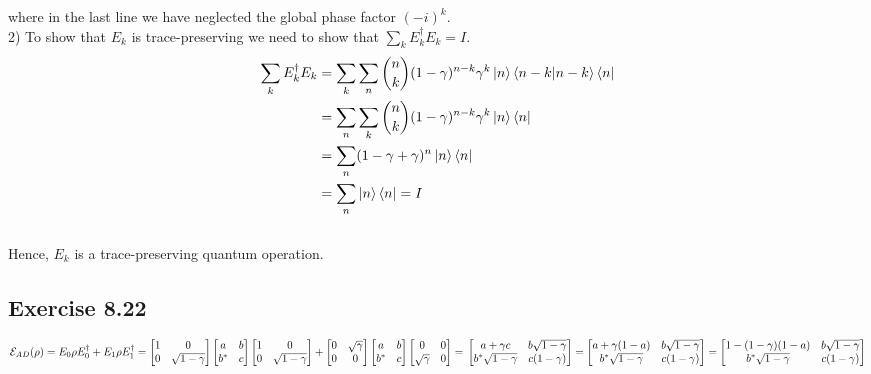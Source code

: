 \documentclass[a4paper,12pt]{article}
\begin{document}
where in the last line we have neglected the global phase factor $(-i)^k$.\\
2) To show that $E_k$ is trace-preserving we need to show that $\displaystyle \sum_k E_k^\dagger E_k=I$.
\begin{align*}
    \displaystyle \sum_k E_k^\dagger E_k&=\sum_k\sum_n{n \choose k}(1-\gamma)^{n-k}\gamma^k
    \ket{n}\braket{n-k|n-k}\bra{n}\\
    &= \sum_n\sum_k{n \choose k}(1-\gamma)^{n-k}\gamma^k
    \ket{n}\bra{n}\\
    &=\sum_n(1-\gamma+\gamma)^n\ket{n}\bra{n}\\
    &=\sum_n \ket{n}\bra{n}=I
\end{align*}\\

Hence, $E_k$ is a trace-preserving quantum operation.
\subsection*{Exercise 8.22}
$\mathcal{E}_{AD}(\rho)=E_0\rho E_0^\dagger+E_1\rho E_1^\dagger=
\begin{bmatrix}
    1&0\\
    0&\sqrt{1-\gamma}
\end{bmatrix}
\begin{bmatrix}
    a&b\\
    b^*&c
\end{bmatrix}
\begin{bmatrix}
    1&0\\
    0&\sqrt{1-\gamma}
\end{bmatrix}+
\begin{bmatrix}
    0&\sqrt{\gamma}\\
    0&0
\end{bmatrix}
\begin{bmatrix}
    a&b\\
    b^*&c
\end{bmatrix}
\begin{bmatrix}
    0&0\\
    \sqrt{\gamma}&0
\end{bmatrix}=\\
\begin{bmatrix}
    a+\gamma c & b\sqrt{1-\gamma}\\
    b^*\sqrt{1-\gamma}& c(1-\gamma)
\end{bmatrix}=
\begin{bmatrix}
    a+\gamma(1-a) & b\sqrt{1-\gamma}\\
    b^*\sqrt{1-\gamma}& c(1-\gamma)
\end{bmatrix}=
\begin{bmatrix}
    1-(1-\gamma)(1-a) & b\sqrt{1-\gamma}\\
    b^*\sqrt{1-\gamma}& c(1-\gamma)
\end{bmatrix}$
\end{document}
